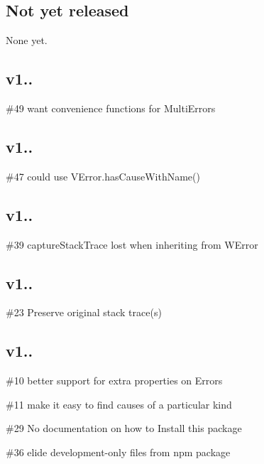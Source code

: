 \subsection*{Not yet released}

None yet.

\subsection*{v1..}


\begin{DoxyItemize}
\item \#49 want convenience functions for Multi\+Errors
\end{DoxyItemize}

\subsection*{v1..}


\begin{DoxyItemize}
\item \#47 could use V\+Error.\+has\+Cause\+With\+Name()
\end{DoxyItemize}

\subsection*{v1..}


\begin{DoxyItemize}
\item \#39 capture\+Stack\+Trace lost when inheriting from W\+Error
\end{DoxyItemize}

\subsection*{v1..}


\begin{DoxyItemize}
\item \#23 Preserve original stack trace(s)
\end{DoxyItemize}

\subsection*{v1..}


\begin{DoxyItemize}
\item \#10 better support for extra properties on Errors
\item \#11 make it easy to find causes of a particular kind
\item \#29 No documentation on how to Install this package
\item \#36 elide development-\/only files from npm package 
\end{DoxyItemize}